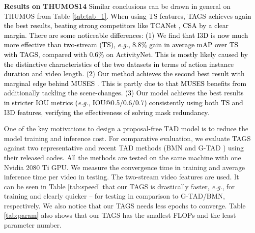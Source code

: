 \documentclass[runningheads]{llncs}
\newcommand{\eg}{\textit{e.g.}}
\newcommand{\shortmodelname}{TAGS}
\begin{document}
\noindent \textbf{Results on THUMOS14 } 
Similar conclusions can be drawn in general on THUMOS from Table \ref{tab:tab_1}. 
\textcolor{black}{When using TS features, {\shortmodelname} achieves again the best results, beating strong competitors like TCANet \cite{wang2021temporal}, CSA \cite{sridhar2021class} by a clear margin. There are some noticeable differences:
(1) We find that I3D is now much more effective than two-stream (TS),
\eg, 8.8\% gain in average mAP over TS with {\shortmodelname}, compared with 0.6\% on ActivityNet. This is mostly likely caused by the distinctive characteristics of the two datasets in terms of action instance duration and video length.
(2) Our method achieves the second best result with marginal edge behind MUSES \cite{liu2021multi}.
This is partly due to that MUSES benefits from additionally tackling the scene-changes. \textcolor{black}{(3) Our model achieves the best results in stricter IOU metrics (\eg, IOU@0.5/0.6/0.7) consistently using both TS and I3D features, verifying the effectiveness of solving mask redundancy.}
}




One of the key motivations to design a proposal-free TAD model is to reduce the model training and inference cost.
For comparative evaluation, we evaluate
{\shortmodelname} against two representative and recent TAD methods (BMN \cite{lin2019bmn} and G-TAD \cite{xu2020g})
using their released codes.
All the methods are tested on the same machine with one Nvidia 2080 Ti GPU.
We measure the convergence time in training
and average inference time per video in testing.
{The two-stream video features are used.}
It can be seen in Table \ref{tab:speed} that our {\shortmodelname}
is drastically faster, \eg,  for training and clearly quicker --  for testing in comparison to G-TAD/BMN, respectively.
We also notice that our {\shortmodelname} needs less epochs to converge.
Table \ref{tab:param} also shows that our {\shortmodelname} has the smallest FLOPs and the least parameter number.
\end{document}
